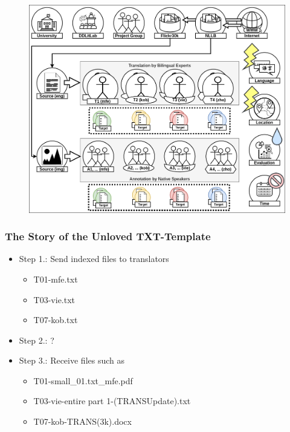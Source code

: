 \documentclass[aspectratio=169]{beamer}
\begin{document}
\begin{frame}[fragile]
\begin{minipage}{.60\textwidth}
\begin{figure}
            \includegraphics[width=1.0\textwidth]{images/MTACR-Overview.png} 
        \end{figure}
    \end{minipage}
\end{frame}

\begin{frame}[fragile]
	\frametitle{The Story of the Unloved TXT-Template}
    \centering
    \large
    \begin{itemize}
        \item Step 1.: Send indexed files to translators
        \begin{itemize}
            \item T01-mfe.txt
            \item T03-vie.txt
            \item T07-kob.txt
        \end{itemize}
        \item Step 2.: ?
        \item Step 3.: Receive files such as
        \begin{itemize}
            \item T01-small\_01.txt\_mfe.pdf
            \item T03-vie-entire part 1-(TRANSUpdate).txt
            \item T07-kob-TRANS(3k).docx
        \end{itemize}
    \end{itemize}
\end{frame}
\end{document}
